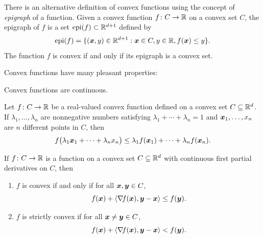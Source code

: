 \begin{remark}
There is an alternative definition of convex functions using the concept of \emph{epigraph} of a function.  Given a convex function $f\colon C \to \mathbb{R}$ on a convex set $C$, the epigraph of $f$ is a set $\operatorname{epi}(f) \subset \mathbb{R}^{d+1}$ defined by
\begin{equation*}
\operatorname{epi}(f) = \{ (\boldsymbol{x},y) \in \mathbb{R}^{d+1} : \boldsymbol{x} \in C, y \in \mathbb{R}, f(\boldsymbol{x}) \leq y \}.
\end{equation*}
The function $f$ is convex if and only if its epigraph is a convex set.
\end{remark}

\separator

Convex functions have many pleasant properties:
\begin{theorem}\label{theorem:ConvexIsContinuous}
Convex functions are continuous.
\end{theorem}

\begin{theorem}
Let $f\colon C \to \mathbb{R}$ be a real-valued convex function defined on a convex set $C \subseteq \mathbb{R}^d$.  If $\lambda_1, \dotsc, \lambda_n$ are nonnegative numbers satisfying $\lambda_1 + \dotsb + \lambda_n = 1$ and $\boldsymbol{x}_1, \dotsc, x_n$ are $n$ different points in $C$, then
\begin{equation*}
f\big( \lambda_1 \boldsymbol{x}_1 + \dotsb + \lambda_n x_n \big) \leq \lambda_1 f(\boldsymbol{x}_1) + \dotsb + \lambda_n f(\boldsymbol{x}_n).
\end{equation*}
\end{theorem}

\begin{theorem}\label{theorem:convexAboveTangentHyperplane}
If $f\colon C \to \mathbb{R}$ is a function on a convex set $C \subseteq \mathbb{R}^d$ with continuous first partial derivatives on $C$, then
\begin{enumerate}
	\item $f$ is convex if and only if for all $\boldsymbol{x}, \boldsymbol{y} \in C$,
	\begin{equation*}
	f(\boldsymbol{x}) + \langle \mathop{\nabla\! {f}}(\boldsymbol{x}), \boldsymbol{y} - \boldsymbol{x} \rangle \leq f(\boldsymbol{y}).
	\end{equation*}
	\item $f$ is strictly convex if for all $\boldsymbol{x} \neq \boldsymbol{y} \in C$,
	\begin{equation*}
	f(\boldsymbol{x}) + \langle \mathop{\nabla\! {f}}(\boldsymbol{x}), \boldsymbol{y} - \boldsymbol{x} \rangle < f(\boldsymbol{y}).
	\end{equation*}
\end{enumerate}
\end{theorem}

